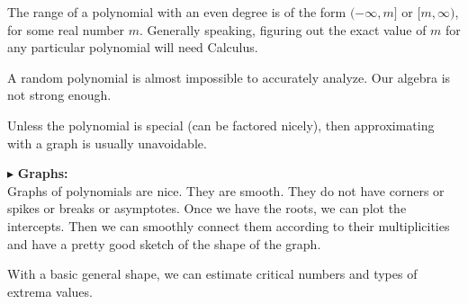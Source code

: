 \documentclass{ximera}
\begin{document}
The range of a polynomial with an even degree is of the form $(-\infty, m]$ or $[m, \infty)$, for some real number $m$.  Generally speaking, figuring out the exact value of $m$ for any particular polynomial will need Calculus.










\begin{center}

A random polynomial is almost impossible to accurately analyze. Our algebra is not strong enough.


Unless the polynomial is special (can be factored nicely), then approximating with a graph is usually unavoidable.

\end{center}



$\blacktriangleright$ \textbf{\textcolor{red!10!blue!90!}{Graphs:}} \\ 
Graphs of polynomials are nice.  They are smooth.  They do not have corners or spikes or breaks or asymptotes. Once we have the roots, we can plot the intercepts.  Then we can smoothly connect them according to their multiplicities and have a pretty good sketch of the shape of the graph.

With a basic general shape, we can estimate critical numbers and types of extrema values.
\end{document}
